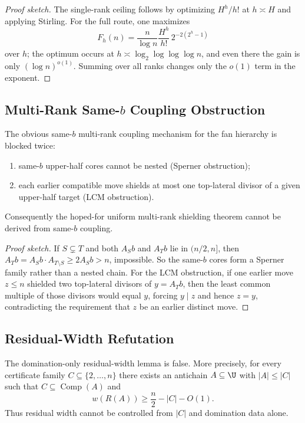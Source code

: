 \begin{proof}[Proof sketch]
The single-rank ceiling follows by optimizing $H^h/h!$ at $h\asymp H$ and
applying Stirling.  For the full route, one maximizes
\[
F_h(n)=\frac{n}{\log n}\frac{H^h}{h!}\,2^{-2(2^h-1)}
\]
over $h$; the optimum occurs at $h\asymp \log_2\log\log\log n$, and even there
the gain is only $(\log n)^{o(1)}$.  Summing over all ranks changes only the
$o(1)$ term in the exponent.
\end{proof}

\subsection{Multi-Rank Same-$b$ Coupling Obstruction}

\begin{proposition}\label{prop:same-b-coupling}
The obvious same-$b$ multi-rank coupling mechanism for the fan hierarchy is
blocked twice:
\begin{enumerate}
  \item same-$b$ upper-half cores cannot be nested (Sperner obstruction);
  \item each earlier compatible move shields at most one top-lateral divisor of
  a given upper-half target (LCM obstruction).
\end{enumerate}
Consequently the hoped-for uniform multi-rank shielding theorem cannot be
derived from same-$b$ coupling.
\end{proposition}

\begin{proof}[Proof sketch]
If $S\subsetneq T$ and both $A_S b$ and $A_T b$ lie in $(n/2,n]$, then
$A_Tb=A_Sb\cdot A_{T\setminus S}\ge 2A_Sb>n$, impossible.  So the same-$b$
cores form a Sperner family rather than a nested chain.  For the LCM
obstruction, if one earlier move $z\le n$ shielded two top-lateral divisors of
$y=A_Tb$, then the least common multiple of those divisors would equal $y$,
forcing $y\mid z$ and hence $z=y$, contradicting the requirement that $z$ be an
earlier distinct move.
\end{proof}

\subsection{Residual-Width Refutation}

\begin{proposition}\label{prop:residual-width}
The domination-only residual-width lemma is false.  More precisely, for every
certificate family $C\subseteq \{2,\dots,n\}$ there exists an antichain
$A\subseteq \U$ with $|A|\le |C|$ such that $C\subseteq \operatorname{Comp}(A)$ and
\[
w(R(A))\ge \frac n2-|C|-O(1).
\]
Thus residual width cannot be controlled from $|C|$ and domination data alone.
\end{proposition}

